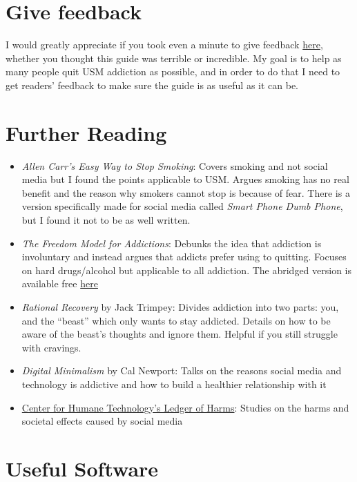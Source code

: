 \documentclass[
  openany]{book}
\providecommand{\tightlist}{%
  \setlength{\itemsep}{0pt}\setlength{\parskip}{0pt}}
\begin{document}
\chapter{Give feedback}\label{give-feedback}

I would greatly appreciate if you took even a minute to give feedback \href{https://forms.gle/M2rEM9J7Q3QiuCGt6}{here}, whether you thought this guide was terrible or incredible. My goal is to help as many people quit USM addiction as possible, and in order to do that I need to get readers' feedback to make sure the guide is as useful as it can be.

\appendix


\chapter{Further Reading}\label{further-reading}

\begin{itemize}
\tightlist
\item
  \emph{Allen Carr's Easy Way to Stop Smoking}: Covers smoking and not social media but I found the points applicable to USM. Argues smoking has no real benefit and the reason why smokers cannot stop is because of fear. There is a version specifically made for social media called \emph{Smart Phone Dumb Phone}, but I found it not to be as well written.
\item
  \emph{The Freedom Model for Addictions}: Debunks the idea that addiction is involuntary and instead argues that addicts prefer using to quitting. Focuses on hard drugs/alcohol but applicable to all addiction. The abridged version is available free \href{https://archive.org/details/freedom-model-abridged/Freedom\%20Model\%20Abridged/}{here}
\item
  \emph{Rational Recovery} by Jack Trimpey: Divides addiction into two parts: you, and the ``beast'' which only wants to stay addicted. Details on how to be aware of the beast's thoughts and ignore them. Helpful if you still struggle with cravings.
\item
  \emph{Digital Minimalism} by Cal Newport: Talks on the reasons social media and technology is addictive and how to build a healthier relationship with it
\item
  \href{https://ledger.humanetech.com/}{Center for Humane Technology's Ledger of Harms}: Studies on the harms and societal effects caused by social media
\end{itemize}

\chapter{Useful Software}\label{AP-soft}
\end{document}
